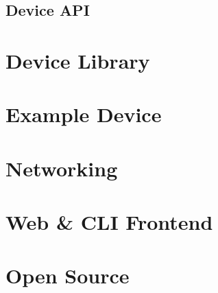 \subsection{Device API} \label{sec:chap3:server:api}

\section{Device Library} \label{sec:chap3:devicelib}
\section{Example Device} \label{sec:chap3:deviceexample}
\section{Networking}

\section{Web \& CLI Frontend} \label{sec:chap3:frontend}
\section{Open Source} \label{sec:chap3:opensource}
